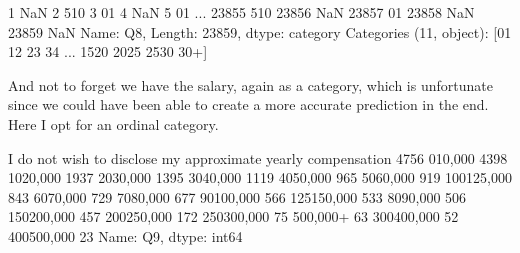 \documentclass[letterpaper,10pt,english]{jupyterBook}
\begin{document}
\begin{sphinxVerbatim}[commandchars=\\\{\}]
1         NaN
2        5\PYGZhy{}10
3         0\PYGZhy{}1
4         NaN
5         0\PYGZhy{}1
         ... 
23855    5\PYGZhy{}10
23856     NaN
23857     0\PYGZhy{}1
23858     NaN
23859     NaN
Name: Q8, Length: 23859, dtype: category
Categories (11, object): [\PYGZsq{}0\PYGZhy{}1\PYGZsq{} \PYGZlt{} \PYGZsq{}1\PYGZhy{}2\PYGZsq{} \PYGZlt{} \PYGZsq{}2\PYGZhy{}3\PYGZsq{} \PYGZlt{} \PYGZsq{}3\PYGZhy{}4\PYGZsq{} ... \PYGZsq{}15\PYGZhy{}20\PYGZsq{} \PYGZlt{} \PYGZsq{}20\PYGZhy{}25\PYGZsq{} \PYGZlt{} \PYGZsq{}25\PYGZhy{}30\PYGZsq{} \PYGZlt{} \PYGZsq{}30+\PYGZsq{}]
\end{sphinxVerbatim}

\sphinxAtStartPar
And not to forget we have the salary, again as a category, which is unfortunate since we could have been able to create a more accurate prediction in the end.
Here I opt for an ordinal category.

\begin{sphinxVerbatim}[commandchars=\\\{\}]
\end{sphinxVerbatim}

\begin{sphinxVerbatim}[commandchars=\\\{\}]
I do not wish to disclose my approximate yearly compensation    4756
0\PYGZhy{}10,000                                                        4398
10\PYGZhy{}20,000                                                       1937
20\PYGZhy{}30,000                                                       1395
30\PYGZhy{}40,000                                                       1119
40\PYGZhy{}50,000                                                        965
50\PYGZhy{}60,000                                                        919
100\PYGZhy{}125,000                                                      843
60\PYGZhy{}70,000                                                        729
70\PYGZhy{}80,000                                                        677
90\PYGZhy{}100,000                                                       566
125\PYGZhy{}150,000                                                      533
80\PYGZhy{}90,000                                                        506
150\PYGZhy{}200,000                                                      457
200\PYGZhy{}250,000                                                      172
250\PYGZhy{}300,000                                                       75
500,000+                                                          63
300\PYGZhy{}400,000                                                       52
400\PYGZhy{}500,000                                                       23
Name: Q9, dtype: int64
\end{sphinxVerbatim}
\end{document}
